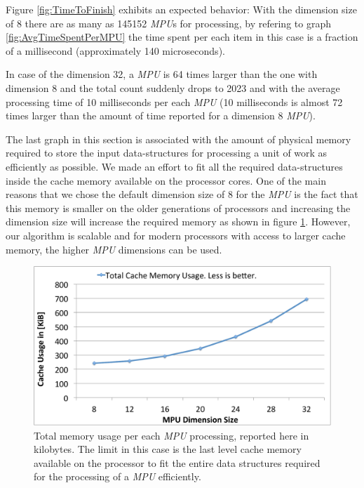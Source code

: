 Figure \ref{fig:TimeToFinish} exhibits an expected behavior: With the dimension size of 8 there are as many
as 145152 \textit{MPU}s for processing, by refering to graph \ref{fig:AvgTimeSpentPerMPU} the time spent 
per each item in this case is a fraction of a millisecond (approximately 140 microseconds). 

In case of the dimension 32, a \textit{MPU} is 64 times larger than the one with dimension 8 and the total 
count suddenly drops to 2023 and with the average processing time of 10 milliseconds per each 
\textit{MPU} (10 milliseconds is almost 72 times larger than the amount of time reported for a dimension 8 \textit{MPU}). 

The last graph in this section is associated with the amount of physical memory required to store the 
input data-structures for processing a unit of work as efficiently as possible. We made an effort to fit all the required 
data-structures inside the cache memory available on the processor cores. One of the main reasons that we
chose the default dimension size of 8 for the \textit{MPU} is the fact that this memory is smaller on the 
older generations of processors and increasing the dimension size will increase the required memory as shown in
figure \ref{fig:TotalCacheMemUsage}. However, our algorithm is scalable and for modern processors with 
access to larger cache memory, the higher \textit{MPU} dimensions can be used. 

\begin{figure}[H]
  \centering
  \includegraphics[width = 1.0\linewidth]{figures/cpupoly/MpuSizeAnalysis/TotalCacheMemUsage.pdf}
  \caption{\label{fig:TotalCacheMemUsage}
  {Total memory usage per each \textit{MPU} processing, reported here in kilobytes. 
  The limit in this case is the last level cache memory available on the processor to fit the 
  entire data structures required for the processing of a \textit{MPU} efficiently.}
}
\end{figure}


